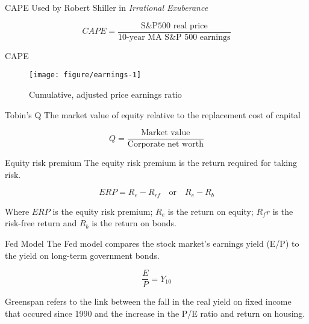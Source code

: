 \documentclass[14pt,xcolor=pdftex,dvipsnames,table]{beamer}\usepackage[]{graphicx}\usepackage[]{color}
\makeatletter
\def\maxwidth{ %
  \ifdim\Gin@nat@width>\linewidth
    \linewidth
  \else
    \Gin@nat@width
  \fi
}
\newenvironment{knitrout}{}{} %
\makeatother
\begin{document}
\begin{frame}{CAPE}
Used by Robert Shiller in \emph{Irrational Exuberance}
\pause
\begin{block}{}
\begin{equation*}
CAPE = \frac{\text{S\&P500 real price}}{\text{10-year MA S\&P 500 earnings}}
\end{equation*}
\end{block}
\end{frame}

\begin{frame}{CAPE}
\begin{knitrout}
\color{fgcolor}\begin{figure}
\texttt{[image: figure/earnings-1]} \caption[Cumulative, adjusted price earnings ratio]{Cumulative, adjusted price earnings ratio\label{fig:earnings}}
\end{figure}


\end{knitrout}
\end{frame}

\begin{frame}{Tobin's Q}
The market value of equity relative to the replacement cost of capital
\begin{block}{}
\begin{equation*}
Q = \frac{\text{Market value}}{\text{Corporate net worth}}
\end{equation*}
\end{block}
\end{frame}

\begin{frame}{Equity risk premium}
The equity risk premium is the return required for taking risk.
\begin{block}{}
\begin{equation}
ERP = R_e - R_{rf} \quad \text{or} \quad R_e - R_b
\end{equation}
\end{block}
Where $ERP$ is the equity risk premium; $R_e$ is the return on equity; $R_fr$ is the risk-free return and $R_b$ is the return on bonds. 
\end{frame}

\begin{frame}{Fed Model}
The Fed model compares the stock market's earnings yield (E/P) to the yield on long-term government bonds. 
\pause
\begin{block}{}
\begin{equation*}
\frac{E}{P} = Y_{10}
\end{equation*}
\end{block}
\pause
Greenspan refers to the link between the fall in the real yield on fixed income that occured since 1990 and the increase in the P/E ratio and return on housing.
\end{frame}
\end{document}
